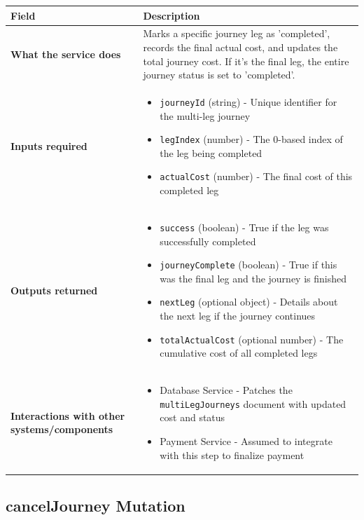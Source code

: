 \documentclass[11pt,a4paper]{article}
\begin{document}
\begin{longtable}{|p{4cm}|p{12cm}|}
\hline
\textbf{Field} & \textbf{Description} \\
\hline
\textbf{What the service does} & 
Marks a specific journey leg as 'completed', records the final actual cost, and updates the total journey cost. If it's the final leg, the entire journey status is set to 'completed'. \\
\hline
\textbf{Inputs required} & 
\begin{itemize}[nosep]
\item \texttt{journeyId} (string) - Unique identifier for the multi-leg journey
\item \texttt{legIndex} (number) - The 0-based index of the leg being completed
\item \texttt{actualCost} (number) - The final cost of this completed leg
\end{itemize} \\
\hline
\textbf{Outputs returned} & 
\begin{itemize}[nosep]
\item \texttt{success} (boolean) - True if the leg was successfully completed
\item \texttt{journeyComplete} (boolean) - True if this was the final leg and the journey is finished
\item \texttt{nextLeg} (optional object) - Details about the next leg if the journey continues
\item \texttt{totalActualCost} (optional number) - The cumulative cost of all completed legs
\end{itemize} \\
\hline
\textbf{Interactions with other systems/components} & 
\begin{itemize}[nosep]
\item Database Service - Patches the \texttt{multiLegJourneys} document with updated cost and status
\item Payment Service - Assumed to integrate with this step to finalize payment
\end{itemize} \\
\hline
\end{longtable}

\subsection{cancelJourney Mutation}
\end{document}
